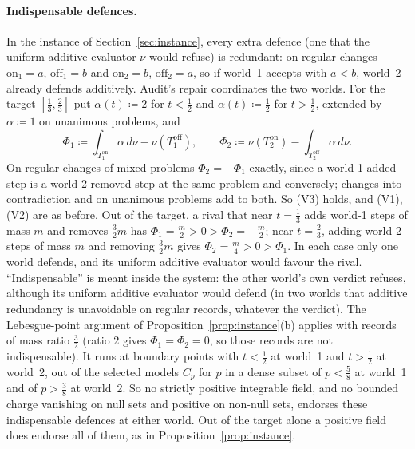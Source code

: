 \documentclass[11pt]{article}
\theoremstyle{definition}\newtheorem{definition}[theorem]{Definition}
\theoremstyle{remark}\newtheorem{remark}[theorem]{Remark}
\newcommand{\on}{\mathrm{on}}
\newcommand{\off}{\mathrm{off}}
\begin{document}
\paragraph{Indispensable defences.} In the instance of
Section~\ref{sec:instance}, every extra defence (one that the uniform additive
evaluator $\nu$ would refuse) is redundant: on regular changes $\on_1=a$,
$\off_1=b$ and $\on_2=b$, $\off_2=a$, so if world~1 accepts with $a<b$, world~2
already defends additively. Audit's repair coordinates the two worlds. For the
target $[\frac13,\frac23]$ put $\alpha(t)\coloneqq2$ for $t<\frac12$ and
$\alpha(t)\coloneqq\frac12$ for $t>\frac12$, extended by $\alpha\coloneqq1$ on
unanimous problems, and
\[
 \Phi_1\coloneqq\int_{T^\on_1}\alpha\,d\nu-\nu(T^\off_1),\qquad
 \Phi_2\coloneqq\nu(T^\on_2)-\int_{T^\off_2}\alpha\,d\nu .
\]
On regular changes of mixed problems $\Phi_2=-\Phi_1$ exactly, since a world-1
added step is a world-2 removed step at the same problem and conversely;
changes into contradiction and on unanimous problems add to both. So (V3)
holds, and (V1), (V2) are as before. Out of the target, a rival that near
$t=\frac13$ adds world-1 steps of mass $m$ and removes $\frac32m$ has
$\Phi_1=\frac m2>0>\Phi_2=-\frac m2$; near $t=\frac23$, adding world-2 steps of
mass $m$ and removing $\frac32m$ gives $\Phi_2=\frac m4>0>\Phi_1$. In each case
only one world defends, and its uniform additive evaluator would favour the
rival. ``Indispensable'' is meant inside the system: the other world's own
verdict refuses, although its uniform additive evaluator would defend (in two
worlds that additive redundancy is unavoidable on regular records, whatever the
verdict). The Lebesgue-point argument of Proposition~\ref{prop:instance}(b)
applies with records of mass ratio $\frac32$ (ratio $2$ gives
$\Phi_1=\Phi_2=0$, so those records are not indispensable). It runs at
boundary points with $t<\frac12$ at world~1 and $t>\frac12$ at world~2, out of
the selected models $C_p$ for $p$ in a dense subset of $p<\frac58$ at world~1
and of $p>\frac38$ at world~2. So no strictly positive integrable field, and no
bounded charge vanishing on null sets and positive on non-null sets, endorses
these indispensable defences at either world. Out of the target alone a
positive field does endorse all of them, as in Proposition~\ref{prop:instance}.
\end{document}
